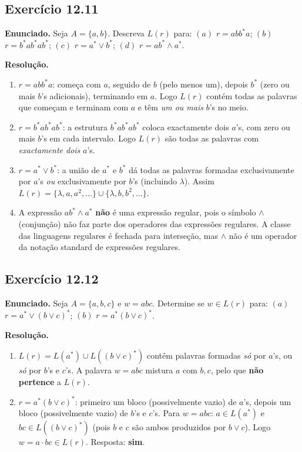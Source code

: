 \documentclass[12pt,a4paper]{article}
\begin{document}
\subsection*{Exercício 12.11}

\textbf{Enunciado.} Seja $A = \{a,b\}$. Descreva $L(r)$ para:
$(a)$ $r = abb^*a$;\;
$(b)$ $r = b^*ab^*ab^*$;\;
$(c)$ $r = a^* \vee b^*$;\;
$(d)$ $r = ab^* \wedge a^*$.

\medskip
\textbf{Resolução.}

\begin{enumerate}[label=(\alph*)]
  \item $r = abb^*a$: começa com $a$, seguido de $b$ (pelo menos um), depois $b^*$
        (zero ou mais $b$'s adicionais), terminando em $a$. Logo $L(r)$ contém todas as
        palavras que começam e terminam com $a$ e têm \emph{um ou mais} $b$'s no meio.

  \item $r = b^*ab^*ab^*$: a estrutura $b^*ab^*ab^*$ coloca exactamente dois $a$'s,
        com zero ou mais $b$'s em cada intervalo. Logo $L(r)$ são todas as palavras com
        \emph{exactamente dois} $a$'s.

  \item $r = a^* \vee b^*$: a união de $a^*$ e $b^*$ dá todas as palavras formadas
        exclusivamente por $a$'s \emph{ou} exclusivamente por $b$'s (incluindo $\lambda$).
        Assim $L(r) = \{\lambda, a, a^2, \ldots\} \cup \{\lambda, b, b^2, \ldots\}$.

  \item A expressão $ab^* \wedge a^*$ \textbf{não} é uma expressão regular, pois o
        símbolo $\wedge$ (conjunção) não faz parte dos operadores das expressões regulares.
        A classe das linguagens regulares é fechada para interseção, mas $\wedge$ não é
        um operador da notação standard de expressões regulares.
\end{enumerate}

\subsection*{Exercício 12.12}

\textbf{Enunciado.} Seja $A = \{a,b,c\}$ e $w = abc$. Determine se $w \in L(r)$ para:
$(a)$ $r = a^* \vee (b \vee c)^*$;\; $(b)$ $r = a^*(b \vee c)^*$.

\medskip
\textbf{Resolução.}

\begin{enumerate}[label=(\alph*)]
  \item $L(r) = L(a^*) \cup L((b \vee c)^*)$ contém palavras formadas \emph{só} por $a$'s,
        ou \emph{só} por $b$'s e $c$'s. A palavra $w = abc$ mistura $a$ com $b,c$,
        pelo que \textbf{não pertence} a $L(r)$.

  \item $r = a^*(b \vee c)^*$: primeiro um bloco (possivelmente vazio) de $a$'s,
        depois um bloco (possivelmente vazio) de $b$'s e $c$'s.
        Para $w = abc$: $a \in L(a^*)$ e $bc \in L((b \vee c)^*)$ (pois $b$ e $c$ são
        ambos produzidos por $b \vee c$). Logo $w = a \cdot bc \in L(r)$.
        Resposta: \textbf{sim}.
\end{enumerate}
\end{document}
